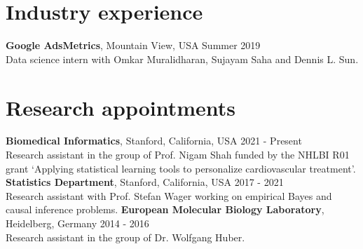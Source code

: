 \documentclass[margin,line]{res}
\begin{document}
\begin{resume}
\section{\sc Industry experience}
\textbf{Google AdsMetrics}, Mountain View, USA \hfill Summer 2019\\
Data science intern with Omkar Muralidharan, Sujayam Saha and Dennis L. Sun. 


\section{\sc Research appointments}
{\bf Biomedical Informatics},  Stanford, California, USA \hfill 2021 - Present\\
Research assistant in the group of Prof. Nigam Shah funded by the NHLBI R01 grant `Applying statistical learning tools to personalize cardiovascular treatment'.\\
{\bf Statistics Department},  Stanford, California, USA \hfill 2017 - 2021\\
Research assistant with Prof. Stefan Wager working on empirical Bayes and causal inference problems.
{\bf European Molecular Biology Laboratory},  Heidelberg, Germany \hfill 2014 - 2016\\
Research assistant in the group of Dr. Wolfgang Huber.


\end{resume}
\end{document}

